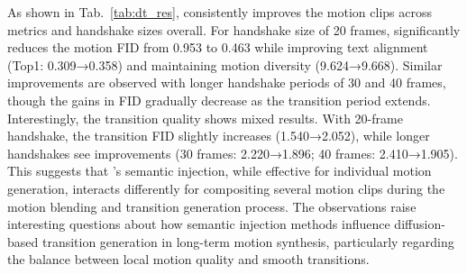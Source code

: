 As shown in Tab.~\ref{tab:dt_res}, {\modulename} consistently improves the motion clips across metrics and handshake sizes overall. 
For handshake size of 20 frames, {\modulename} significantly reduces the motion FID from 0.953 to 0.463 while improving text alignment (Top1: 0.309→0.358) and maintaining motion diversity (9.624→9.668). 
Similar improvements are observed with longer handshake periods of 30 and 40 frames, though the gains in FID gradually decrease as the transition period extends.
Interestingly, the transition quality shows mixed results. With 20-frame handshake, the transition FID slightly increases (1.540→2.052), while longer handshakes see improvements (30 frames: 2.220→1.896; 40 frames: 2.410→1.905). 
This suggests that {\modulename}'s semantic injection, while effective for individual motion generation, interacts differently for compositing several motion clips during the motion blending and transition generation process.
The observations raise interesting questions about how semantic injection methods influence diffusion-based transition generation in long-term motion synthesis, particularly regarding the balance between local motion quality and smooth transitions. 





